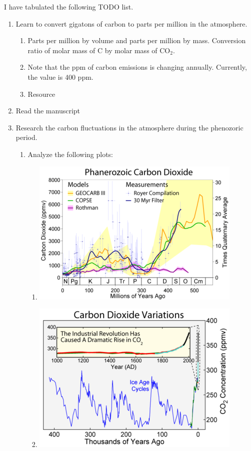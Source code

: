 I have tabulated the following TODO list.

\begin{enumerate}
  \item 
    Learn to convert gigatons of carbon to parts per million in the atmosphere.
    \begin{enumerate}
      \item Parts per million by volume and parts per million by mass. Conversion ratio of molar mass of C by molar mass of CO$_2$.
      \item Note that the ppm of carbon emissions is changing annually. Currently, the value is 400 ppm.
      \item 
        Resource 
    \end{enumerate}
  \item Read the manuscript ~\citet{DR:2013}
  \item Research the carbon fluctuations in the atmosphere during the phenozoric period. 
    \begin{enumerate}
      \item Analyze the following plots:
        \begin{enumerate}
          \item \includegraphics[scale=0.5]{00LOG/UNDATED/00FIGURES/Phanerozoic_Carbon_Dioxide.png}
          \item \includegraphics[scale=0.5]{00LOG/UNDATED/00FIGURES/Carbon_Dioxide_400kyr.png}

\end{enumerate}
\end{enumerate}
\end{enumerate}
